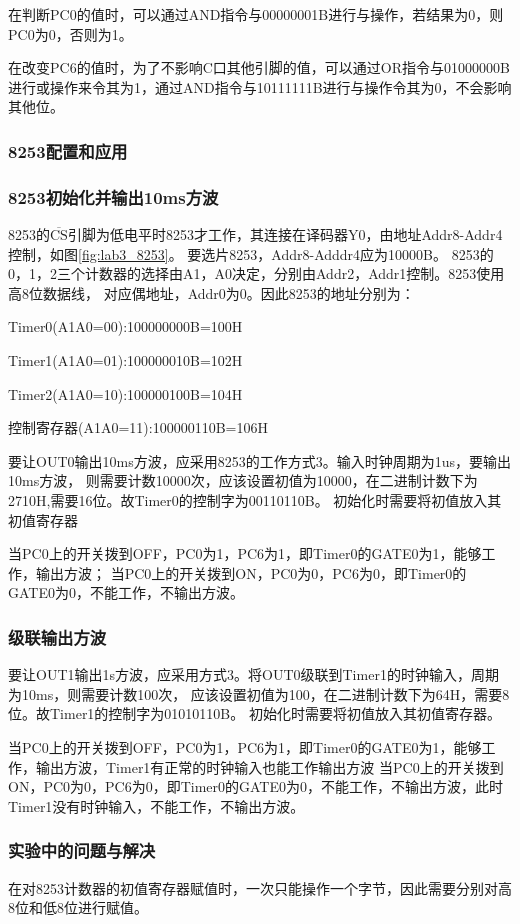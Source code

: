 \documentclass[12pt, a4paper, oneside]{ctexart}
\begin{document}
    在判断PC0的值时，可以通过AND指令与00000001B进行与操作，若结果为0，则PC0为0，否则为1。

    在改变PC6的值时，为了不影响C口其他引脚的值，可以通过OR指令与01000000B进行或操作来令其为1，通过AND指令与10111111B进行与操作令其为0，不会影响其他位。
    \subsubsection{8253配置和应用}
    \subsubsection{8253初始化并输出10ms方波}
    8253的$\overline{\text{CS}}$引脚为低电平时8253才工作，其连接在译码器Y0，由地址Addr8-Addr4控制，如图\ref{fig:lab3_8253}。
    要选片8253，Addr8-Adddr4应为10000B。
    8253的0，1，2三个计数器的选择由A1，A0决定，分别由Addr2，Addr1控制。8253使用高8位数据线，
    对应偶地址，Addr0为0。因此8253的地址分别为：

    Timer0(A1A0=00):100000000B=100H

    Timer1(A1A0=01):100000010B=102H

    Timer2(A1A0=10):100000100B=104H

    控制寄存器(A1A0=11):100000110B=106H

    要让OUT0输出10ms方波，应采用8253的工作方式3。输入时钟周期为1us，要输出10ms方波，
    则需要计数10000次，应该设置初值为10000，在二进制计数下为2710H,需要16位。故Timer0的控制字为00110110B。
    初始化时需要将初值放入其初值寄存器

    当PC0上的开关拨到OFF，PC0为1，PC6为1，即Timer0的GATE0为1，能够工作，输出方波；
    当PC0上的开关拨到ON，PC0为0，PC6为0，即Timer0的GATE0为0，不能工作，不输出方波。


    \subsubsection{级联输出方波}
    要让OUT1输出1s方波，应采用方式3。将OUT0级联到Timer1的时钟输入，周期为10ms，则需要计数100次，
    应该设置初值为100，在二进制计数下为64H，需要8位。故Timer1的控制字为01010110B。
    初始化时需要将初值放入其初值寄存器。

    当PC0上的开关拨到OFF，PC0为1，PC6为1，即Timer0的GATE0为1，能够工作，输出方波，Timer1有正常的时钟输入也能工作输出方波
    当PC0上的开关拨到ON，PC0为0，PC6为0，即Timer0的GATE0为0，不能工作，不输出方波，此时Timer1没有时钟输入，不能工作，不输出方波。
    \subsubsection{实验中的问题与解决}
    在对8253计数器的初值寄存器赋值时，一次只能操作一个字节，因此需要分别对高8位和低8位进行赋值。

    
\end{document}
